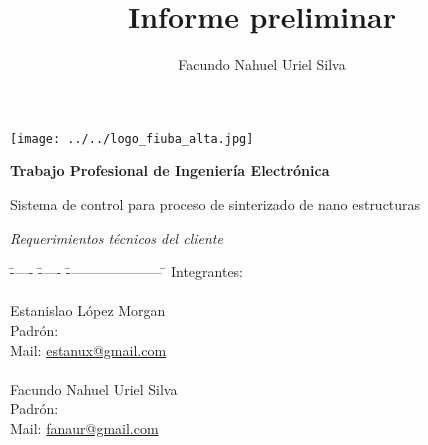 \documentclass[12pt]{article}
\title{Informe preliminar}
\author{Facundo Nahuel Uriel Silva}
\begin{document}
  \newpage
  \thispagestyle{empty}
  
  \begin{center}
    \texttt{[image: ../../logo\_fiuba\_alta.jpg]} 

  \vspace{100px}

  {\bf \Huge{Trabajo Profesional de Ingeniería Electrónica} }
  
  \vspace{50px}

  \huge{ Sistema de control para proceso de sinterizado de nano estructuras }

  \vspace{50px}

  \huge{ \textit{Requerimientos técnicos del cliente} } 

  \end{center}

  \vspace{70px}

   \begin{bf}
    \begin{Large}
      \begin{tabbing}
	\= ----- \= ----- \= --------------------- \= \kill
	\> Integrantes:\\
	\\
	  \>\> Estanislao López Morgan \\
	  \>\>\>  Padrón:	 \\
	  \>\>\>  Mail:	\>\url{estanux@gmail.com} \\
	\\
	  \>\> Facundo Nahuel Uriel Silva\\
	  \>\>\>  Padrón:	 \\
	  \>\>\>  Mail:	\> \url{fanaur@gmail.com}\\
      \end{tabbing}
    \end{Large}
  \end{bf}



  \newpage
  
  
  \thispagestyle{empty} \tableofcontents \thispagestyle{empty} %

 
  
 \newpage
\setcounter{page}{1}
\end{document}
